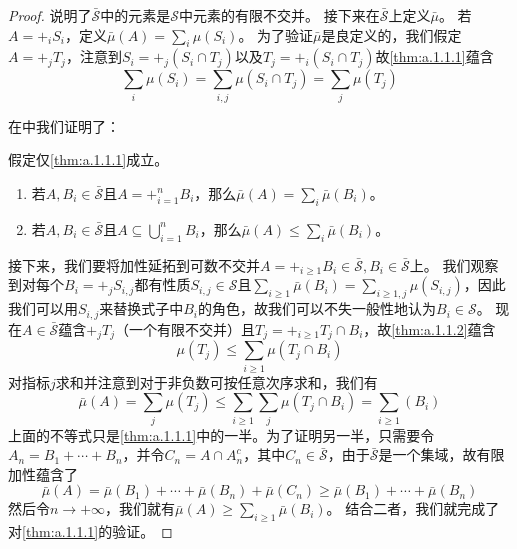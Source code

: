 \documentclass[main.tex]{subfiles}
\begin{document}
\begin{proof}
	说明了\(\bar{\mathcal{S}}\)中的元素是\(\mathcal{S}\)中元素的有限不交并。
	接下来在\(\bar{\mathcal{S}}\)上定义\(\bar{\mu}\)。
	若\(A = +_i S_i\)，定义\(\bar{\mu}(A) = \sum_i\mu(S_i)\)。
	为了验证\(\bar{\mu}\)是良定义的，我们假定\(A = +_jT_j\)，注意到\(S_i = +_j(S_i \cap T_j)\)以及\(T_j = +_i(S_i\cap T_j)\)故\ref{thm:a.1.1.1}蕴含
	\[\sum_i \mu(S_i) = \sum_{i,j}\mu(S_i\cap T_j) = \sum_j \mu(T_j)\]

	在中我们证明了：
	\begin{lemma} \label{a.1.2}
		假定仅\ref{thm:a.1.1.1}成立。
		\begin{enumerate} [label=(\alph*)]
			\item 若\(A, B_i \in \bar{\mathcal{S}}\)且\(A = +_{i=1}^n B_i\)，那么\(\bar{\mu}(A) = \sum_i\bar{\mu}(B_i)\)。
			\item 若\(A, B_i \in \bar{\mathcal{S}}\)且\(A \subseteq \bigcup_{i=1}^n B_i\)，那么\(\bar{\mu}(A) \leq \sum_i\bar{\mu}(B_i)\)。
		\end{enumerate}
	\end{lemma}
	接下来，我们要将加性延拓到可数不交并\(A = +_{i\geq 1}B_i \in \bar{\mathcal{S}}, B_i \in \bar{\mathcal{S}}\)上。
	我们观察到对每个\(B_i = +_j S_{i,j}\)都有性质\(S_{i,j} \in \mathcal{S}\)且\(\sum_{i\geq 1}\bar{\mu}(B_i) = \sum_{i\geq 1,j}\mu(S_{i,j})\)，因此我们可以用\(S_{i,j}\)来替换式子中\(B_i\)的角色，故我们可以不失一般性地认为\(B_i \in \mathcal{S}\)。
	现在\(A \in \bar{\mathcal{S}}\)蕴含\(+_jT_j\)（一个有限不交并）且\(T_j = +_{i\geq 1} T_j\cap B_i\)，故\ref{thm:a.1.1.2}蕴含
	\[\mu(T_j) \leq \sum_{i \geq 1}\mu(T_j \cap B_i)\]
	对指标\(j\)求和并注意到对于非负数可按任意次序求和，我们有
	\[\bar{\mu}(A) = \sum_j\mu(T_j) \leq \sum_{i\geq 1}\sum_j \mu(T_j\cap B_i) = \sum_{i \geq 1}(B_i)\]
	上面的不等式只是\ref{thm:a.1.1.1}中的一半。为了证明另一半，只需要令\(A_n = B_1+\cdots+B_n\)，并令\(C_n = A\cap A_n^c\)，其中\(C_n \in \bar{\mathcal{S}}\)，由于\(\bar{\mathcal{S}}\)是一个集域，故有限加性蕴含了
	\[\bar{\mu}(A) = \bar{\mu}(B_1) + \cdots +\bar{\mu}(B_n) + \bar{\mu}(C_n) \geq \bar{\mu}(B_1) + \cdots + \bar{\mu}(B_n)\]
	然后令\(n \rightarrow +\infty\)，我们就有\(\bar{\mu}(A) \geq \sum_{i\geq 1}\bar{\mu}(B_i)\)。
	结合二者，我们就完成了对\ref{thm:a.1.1.1}的验证。


\end{proof}
\end{document}
